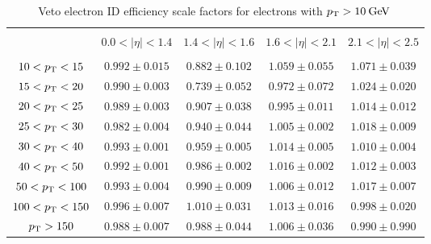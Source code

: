 \begin{table}[!ht]
\centering
\begin{tabular}{|c|c|c|c|c|}
\hline
&                             &                            &                             &                           \\
 & $0.0 < |\eta| < 1.4$ & $1.4 < |\eta| < 1.6$ & $1.6 < |\eta| < 2.1$ & $2.1 < |\eta| < 2.5$ \\
&                             &                            &                             &                           \\
\hline
 $10 < p_\mathrm{T} <  15$ &  $0.992 \pm  0.015$  & $ 0.882 \pm  0.102$  &  $1.059 \pm  0.055  $&  $1.071 \pm  0.039 $\\
\hline
 $15 < p_\mathrm{T} <  20$ &  $0.990 \pm  0.003 $ &  $0.739 \pm  0.052 $ &  $0.972 \pm  0.072  $&  $1.024 \pm  0.020 $\\
\hline
 $20 < p_\mathrm{T} <  25$ &  $0.989 \pm  0.003 $ &  $0.907 \pm  0.038 $ &  $0.995 \pm  0.011  $&  $1.014 \pm  0.012 $\\
 \hline
 $25 < p_\mathrm{T} <  30$ &  $0.982 \pm  0.004 $ &  $0.940 \pm  0.044 $ &  $1.005 \pm  0.002  $&  $1.018 \pm  0.009 $ \\
 \hline
 $30 < p_\mathrm{T} <  40$ &  $0.993 \pm  0.001 $ &  $0.959 \pm  0.005 $ &  $1.014 \pm  0.005  $&  $1.010 \pm  0.004 $\\
 \hline
 $40 < p_\mathrm{T} <  50$ &  $0.992 \pm  0.001 $ &  $0.986 \pm  0.002 $ &  $1.016 \pm  0.002  $&  $1.012 \pm  0.003 $\\
 \hline
 $50 < p_\mathrm{T} < 100$ & $ 0.993 \pm  0.004 $ & $ 0.990 \pm  0.009 $ & $ 1.006 \pm  0.012 $ & $ 1.017 \pm  0.007$ \\
\hline
$100 < p_\mathrm{T} < 150$ & $ 0.996 \pm  0.007 $ & $ 1.010 \pm  0.031 $ & $ 1.013 \pm  0.016 $ & $ 0.998 \pm  0.020 $\\
 \hline 
  $    p_\mathrm{T} > 150$ & $ 0.988 \pm  0.007 $ &  $0.988 \pm  0.044 $ & $ 1.006 \pm  0.036 $ & $ 0.990 \pm  0.990 $\\
\hline
\end{tabular}	
\caption{Veto electron ID efficiency scale factors for electrons with $p_\mathrm{T}>10\:\mathrm{Ge\kern -0.1em V}\:$}
\label{tab:eleveto_sf}
\end{table}

